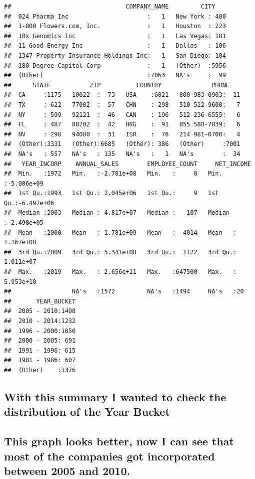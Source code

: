 \documentclass[]{article}
\begin{document}
\begin{verbatim}
##                                COMPANY_NAME         CITY     
##  024 Pharma Inc                      :   1   New York : 400  
##  1-800 Flowers.com, Inc.             :   1   Houston  : 223  
##  10x Genomics Inc                    :   1   Las Vegas: 181  
##  11 Good Energy Inc                  :   1   Dallas   : 106  
##  1347 Property Insurance Holdings Inc:   1   San Diego: 104  
##  180 Degree Capital Corp             :   1   (Other)  :5956  
##  (Other)                             :7063   NA's     :  99  
##      STATE           ZIP          COUNTRY              PHONE     
##  CA     :1175   10022  :  73   USA    :6021   800 983-0903:  11  
##  TX     : 622   77002  :  57   CHN    : 298   510 522-9600:   7  
##  NY     : 599   92121  :  46   CAN    : 196   512 236-6555:   6  
##  FL     : 487   80202  :  42   HKG    :  91   855 588-7839:   6  
##  NV     : 298   94080  :  31   ISR    :  76   214 981-0700:   4  
##  (Other):3331   (Other):6685   (Other): 386   (Other)     :7001  
##  NA's   : 557   NA's   : 135   NA's   :   1   NA's        :  34  
##   YEAR_INCORP    ANNUAL_SALES        EMPLOYEE_COUNT     NET_INCOME        
##  Min.   :1972   Min.   :-2.781e+08   Min.   :     0   Min.   :-5.086e+09  
##  1st Qu.:1993   1st Qu.: 2.045e+06   1st Qu.:     9   1st Qu.:-6.497e+06  
##  Median :2003   Median : 4.817e+07   Median :   107   Median :-2.498e+05  
##  Mean   :2000   Mean   : 1.781e+09   Mean   :  4014   Mean   : 1.167e+08  
##  3rd Qu.:2009   3rd Qu.: 5.341e+08   3rd Qu.:  1122   3rd Qu.: 1.011e+07  
##  Max.   :2019   Max.   : 2.656e+11   Max.   :647500   Max.   : 5.953e+10  
##                 NA's   :1572         NA's   :1494     NA's   :20          
##       YEAR_BUCKET  
##  2005 - 2010:1498  
##  2010 - 2014:1232  
##  1996 - 2000:1050  
##  2000 - 2005: 691  
##  1991 - 1996: 615  
##  1981 - 1986: 607  
##  (Other)    :1376
\end{verbatim}

\hypertarget{with-this-summary-i-wanted-to-check-the-distribution-of-the-year-bucket}{%
\subsection{With this summary I wanted to check the distribution of the
Year
Bucket}\label{with-this-summary-i-wanted-to-check-the-distribution-of-the-year-bucket}}

\hypertarget{this-graph-looks-better-now-i-can-see-that-most-of-the-companies-got-incorporated-between-2005-and-2010.}{%
\subsection{This graph looks better, now I can see that most of the
companies got incorporated between 2005 and
2010.}\label{this-graph-looks-better-now-i-can-see-that-most-of-the-companies-got-incorporated-between-2005-and-2010.}}
\end{document}
